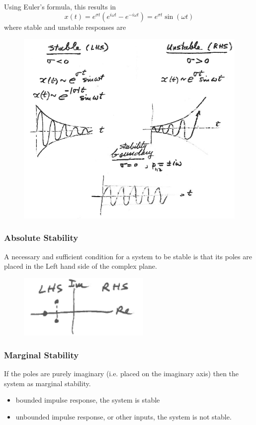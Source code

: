 \documentclass[12pt,letter]{article}
\numberwithin{ex}{section} %
\numberwithin{re}{section} %
\numberwithin{equation}{section}	%
\begin{document}
Using Euler's formula, this results in
\begin{equation}
x(t) = e^{\sigma t} (e^{i \omega t}-e^{-i \omega t}) = e^{\sigma t} \sin(\omega t) 
\end{equation}
where stable and unstable responses are
\begin{figure}[H]
	\centering
	\includegraphics[width=4.5in]{../figures/stability_higher_order_systems_complex_poles}
\end{figure}

\subsubsection{Absolute Stability}
A necessary and sufficient condition for a system to be stable is that its poles are placed in the Left hand side of the complex plane. 
\begin{figure}[H]
	\centering
	\includegraphics[width=2.5in]{../figures/stable_system_complex_plane_simple}
\end{figure}

\subsubsection{Marginal Stability}
If the poles are purely imaginary (i.e. placed on the imaginary axis) then the system as marginal stability. 
\begin{itemize}
	\item bounded impulse response, the system is stable
	\item unbounded impulse response, or other inputs, the system is not stable. 
\end{itemize}
\end{document}
